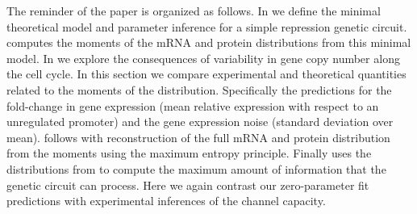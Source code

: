 The reminder of the paper is organized as follows. In  we
define the minimal theoretical model and parameter inference for a simple
repression genetic circuit.  computes the moments of the
mRNA and protein distributions from this minimal model. In
 we explore the consequences of variability in gene copy
number along the cell cycle. In this section we compare experimental and
theoretical quantities related to the moments of the distribution. Specifically
the predictions for the fold-change in gene expression (mean relative expression
with respect to an unregulated promoter) and the gene expression noise (standard
deviation over mean).  follows with reconstruction of the
full mRNA and protein distribution from the moments using the maximum entropy
principle. Finally  uses the distributions from
 to compute the maximum amount of information that the
genetic circuit can process. Here we again contrast our zero-parameter fit
predictions with experimental inferences of the channel capacity.
